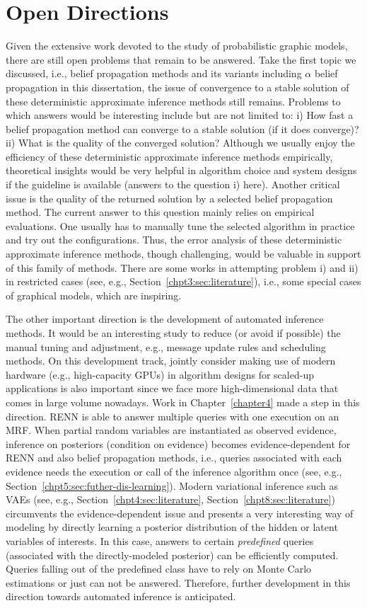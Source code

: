 \section{Open Directions}
Given the extensive work devoted to the study of probabilistic graphic models, there are still open problems that remain to be answered. Take the first topic we discussed, i.e., belief propagation methods and its variants including $\alpha$ belief propagation in this dissertation, the issue of convergence to a stable solution of these deterministic approximate inference methods still remains. Problems to which answers would be interesting include but are not limited to: i) How fast a belief propagation method can converge to a stable solution (if it does converge)? ii) What is the quality of the converged solution? Although we usually enjoy the efficiency of these deterministic approximate inference methods empirically, theoretical insights would be very helpful in algorithm choice and system designs if the guideline is available (answers to the question i) here). Another critical issue is the quality of the returned solution by a selected belief propagation method. The current answer to this question mainly relies on empirical evaluations. One usually has to manually tune the selected algorithm in practice and try out the configurations. Thus, the error analysis of these deterministic approximate inference methods, though challenging, would be valuable in support of this family of methods. There are some works in attempting problem i) and ii) in restricted cases (see, e.g., Section~\ref{chpt3:sec:literature}), i.e., some special cases of graphical models, which are inspiring. 

The other important direction is the development of automated inference methods. It would be an interesting study to reduce (or avoid if possible) the manual tuning and adjustment, e.g., message update rules and scheduling methods. On this development track, jointly consider making use of modern hardware (e.g., high-capacity GPUs) in algorithm designs for scaled-up applications is also important since we face more high-dimensional data that comes in large volume nowadays. Work in Chapter~\ref{chapter4} made a step in this direction. RENN is able to answer multiple queries with one execution on an MRF. When partial random variables are instantiated as observed evidence, inference on posteriors (condition on evidence) becomes evidence-dependent for RENN and also belief propagation methods, i.e., queries associated with each evidence needs the execution or call of the inference algorithm once (see, e.g., Section~\ref{chpt5:sec:futher-dis-learning}). Modern variational inference such as VAEs (see, e.g., Section~\ref{chpt4:sec:literature}, Section~\ref{chpt8:sec:literature}) circumvents the evidence-dependent issue and presents a very interesting way of modeling by directly learning a posterior distribution of the hidden or latent variables of interests. In this case, answers to certain \textit{predefined} queries (associated with the directly-modeled posterior) can be efficiently computed. Queries falling out of the predefined class have to rely on Monte Carlo estimations or just can not be answered. Therefore, further development in this direction towards automated inference is anticipated.


